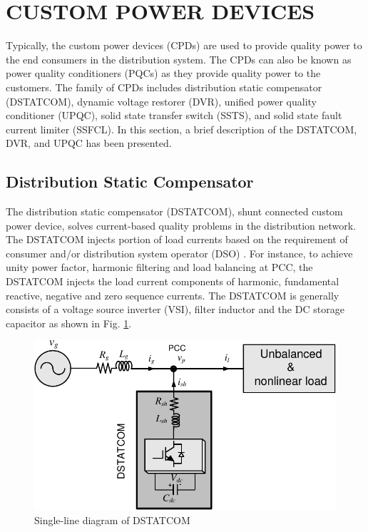  \section{CUSTOM POWER DEVICES}
 
 Typically, the custom power devices (CPDs) are used to provide quality power to the end consumers in the distribution system. The CPDs can also be known as power quality conditioners (PQCs) as they provide quality power to the customers. The family of CPDs includes distribution static compensator (DSTATCOM), dynamic voltage restorer (DVR), unified power quality conditioner (UPQC), solid state transfer switch (SSTS), and solid state fault current limiter (SSFCL). In this section, a brief description of the DSTATCOM, DVR, and UPQC has been presented. 
 
 \subsection{Distribution Static Compensator} 
 
 The distribution static compensator (DSTATCOM), shunt connected custom power device, solves current-based quality problems in the distribution network. The DSTATCOM injects portion of load currents based on the requirement of consumer and/or distribution system operator (DSO) \cite{gyugyi1976active,nastran1994active,torrey1995single,hafner1997shunt}. For instance, to achieve unity power factor, harmonic filtering and load balancing at PCC, the DSTATCOM injects the load current components of harmonic, fundamental reactive, negative and zero sequence currents. The DSTATCOM is generally consists of a voltage source inverter (VSI), filter inductor and the DC storage capacitor as shown in Fig. \ref{fig1.1}.  



\begin{figure}[ht]
	\centering
		\includegraphics[scale=1]{figures/Chapter_1_2/fig1p1.pdf}	\caption{Single-line diagram of DSTATCOM}
	\label{fig1.1}
\end{figure}

